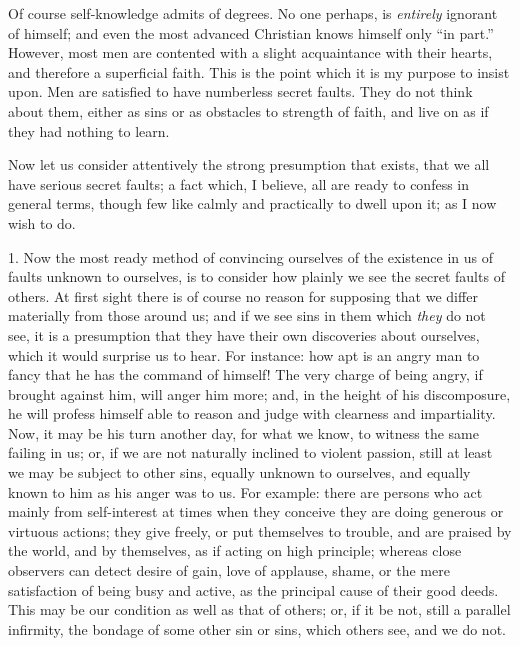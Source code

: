 Of course self-knowledge admits of degrees. No one
perhaps, is \emph{entirely} ignorant of himself; and
even the most advanced Christian knows himself only
``in part.'' However, most men are contented with
a slight acquaintance with their hearts, and therefore a
superficial faith. This is the point which it is my
purpose to insist upon. Men are satisfied to have
numberless secret faults. They do not think about them,
either as sins or as obstacles to strength of faith, and
live on as if they had nothing to learn.

Now let us consider attentively the strong presumption
that exists, that we all have serious secret faults; a
fact which, I believe, all are ready to confess in
general terms, though few like calmly and practically to
dwell upon it; as I now wish to do.

1. Now the most ready method of convincing ourselves
of the existence in us of faults unknown to ourselves, is
to consider how plainly we see the secret faults of
others. At first sight there is of course no reason for supposing that we differ materially from those around us;
and if we see sins in them which \emph{they} do not
see, it is a presumption that they have their own
discoveries about ourselves, which it would surprise us
to hear. For instance: how apt is an angry man to fancy
that he has the command of himself! The very charge of
being angry, if brought against him, will anger him more;
and, in the height of his discomposure, he will profess
himself able to reason and judge with clearness and
impartiality. Now, it may be his turn another day, for
what we know, to witness the same failing in us; or, if
we are not naturally inclined to violent passion, still
at least we may be subject to other sins, equally unknown
to ourselves, and equally known to him as his anger was
to us. For example: there are persons who act mainly from
self-interest at times when they conceive they are doing
generous or virtuous actions; they give freely, or put
themselves to trouble, and are praised by the world, and
by themselves, as if acting on high principle; whereas
close observers can detect desire of gain, love of
applause, shame, or the mere satisfaction of being busy
and active, as the principal cause of their good deeds.
This may be our condition as well as that of others; or,
if it be not, still a parallel infirmity, the bondage of
some other sin or sins, which others see, and we do not.

